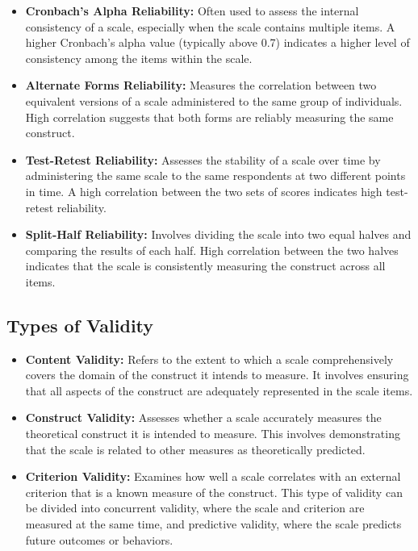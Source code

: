 \documentclass[
]{book}
\begin{document}
\begin{itemize}
\item
  \textbf{Cronbach's Alpha Reliability:} Often used to assess the internal consistency of a scale, especially when the scale contains multiple items. A higher Cronbach's alpha value (typically above 0.7) indicates a higher level of consistency among the items within the scale.
\item
  \textbf{Alternate Forms Reliability:} Measures the correlation between two equivalent versions of a scale administered to the same group of individuals. High correlation suggests that both forms are reliably measuring the same construct.
\item
  \textbf{Test-Retest Reliability:} Assesses the stability of a scale over time by administering the same scale to the same respondents at two different points in time. A high correlation between the two sets of scores indicates high test-retest reliability.
\item
  \textbf{Split-Half Reliability:} Involves dividing the scale into two equal halves and comparing the results of each half. High correlation between the two halves indicates that the scale is consistently measuring the construct across all items.
\end{itemize}

\hypertarget{types-of-validity}{%
\subsection*{Types of Validity}\label{types-of-validity}}

\begin{itemize}
\item
  \textbf{Content Validity:} Refers to the extent to which a scale comprehensively covers the domain of the construct it intends to measure. It involves ensuring that all aspects of the construct are adequately represented in the scale items.
\item
  \textbf{Construct Validity:} Assesses whether a scale accurately measures the theoretical construct it is intended to measure. This involves demonstrating that the scale is related to other measures as theoretically predicted.
\item
  \textbf{Criterion Validity:} Examines how well a scale correlates with an external criterion that is a known measure of the construct. This type of validity can be divided into concurrent validity, where the scale and criterion are measured at the same time, and predictive validity, where the scale predicts future outcomes or behaviors.
\end{itemize}
\end{document}
